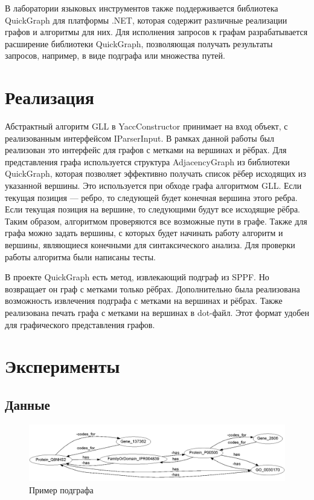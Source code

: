 \documentclass[14pt]{matmex-diploma}
\begin{document}
В лаборатории языковых инструментов также поддерживается библиотека QuickGraph для платформы .NET, которая содержит различные реализации графов и алгоритмы для них. Для исполнения запросов к графам разрабатывается расширение библиотеки QuickGraph, позволяющая получать результаты запросов, например, в виде подграфа или множества путей.

\section{Реализация}
Абстрактный алгоритм GLL в YaccConstructor принимает на вход объект, с реализованным интерфейсом IParserInput. В рамках данной работы был реализован это интерфейс для графов с метками на вершинах и рёбрах. Для представления графа используется структура AdjacencyGraph из библиотеки QuickGraph, которая позволяет эффективно получать список рёбер исходящих из указанной вершины. Это используется при обходе графа алгоритмом GLL. Если текущая позиция --- ребро, то следующей будет конечная вершина этого ребра. Если текущая позиция на вершине, то следующими будут все исходящие рёбра. Таким образом, алгоритмом проверяются все возможные пути в графе. Также для графа можно задать вершины, с которых будет начинать работу алгоритм и вершины, являющиеся конечными для синтаксического анализа. Для проверки работы алгоритма были написаны тесты.

В проекте QuickGraph есть метод, извлекающий подграф из SPPF. Но возвращает он граф с метками только рёбрах. Дополнительно была реализована возможность извлечения подграфа с метками на вершинах и рёбрах. Также реализована печать графа с метками на вершинах в dot-файл. Этот формат удобен для графического представления графов.

\section{Эксперименты}
\subsection{Данные}

\begin{figure}
\centering
\includegraphics[width=16cm]{images/subgraph1.png}
\caption{Пример подграфа}
\label{subgraph}
\end{figure}
\end{document}
